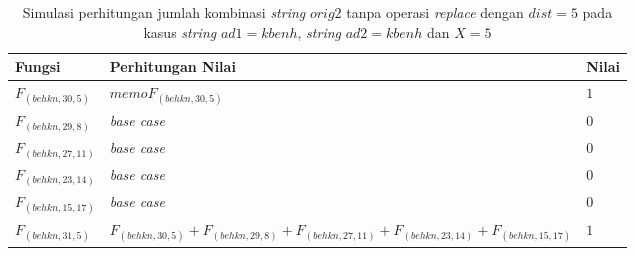 \begin{appendices}
  \begin{table}[H]
  	\centering
  	\begin{tabular} {|p{3cm}|p{5cm}|p{1cm}|} \hline
  		Fungsi & Perhitungan Nilai & Nilai \\ \hline
  		$ F_{(behkn, 30, 5)}  $ & $memoF_{(behkn, 30, 5)}$ & $ 1 $ \\ \hline
  		$ F_{(behkn, 29, 8)} $ & \textit{base case} & $ 0 $ \\ \hline
  		$ F_{(behkn, 27, 11)} $ & \textit{base case} & $ 0 $ \\ \hline
  		$ F_{(behkn, 23, 14)} $ & \textit{base case} & $ 0 $ \\ \hline
  		$ F_{(behkn, 15, 17)} $ & \textit{base case} & $ 0 $ \\ \hline
  		\rowcolor{LightCyan}
  		$ F_{(behkn, 31, 5)}  $ & $F_{(behkn, 30, 5)} + F_{(behkn, 29, 8)} + F_{(behkn, 27, 11)} + F_{(behkn, 23, 14)} + F_{(behkn, 15, 17)}$ & $ 1 $ \\ \hline
  	\end{tabular}\caption{Simulasi perhitungan jumlah kombinasi \textit{string} $ orig2 $ tanpa operasi \textit{replace} dengan $ dist= 5  $ pada kasus \textit{string} $ ad1=kbenh $, \textit{string} $ ad2=kbenh $ dan $ X=5 $}
  	\label{tab:f_3_orig2_5_1}
  \end{table}
  
\end{appendices}